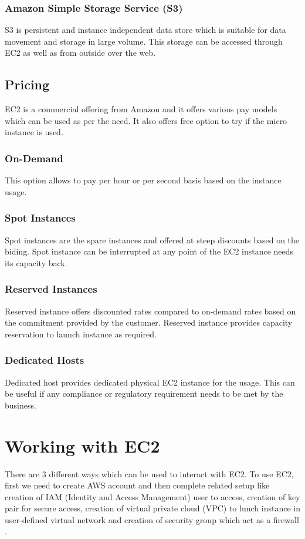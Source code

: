\subsubsection{Amazon Simple Storage Service (S3)} \cite{www-aws-ec2Storage}
S3 is persistent and instance independent data store which is suitable for data movement and storage in large volume. This storage can be accessed through EC2 as well as from outside over the web. 

\subsection{Pricing}
EC2 is a commercial offering from Amazon and it offers various pay models which can be used as per the need. It also offers free option to try if the micro instance is used.
\subsubsection{On-Demand} \cite{www-aws-ec2Pricing}
This option allows to pay per hour or per second basis based on the instance usage.
\subsubsection{Spot Instances} \cite{www-aws-ec2Pricing}
Spot instances are the spare instances and offered at steep discounts based on the biding. Spot instance can be interrupted at any point of the EC2 instance needs its capacity back.
\subsubsection{Reserved Instances} \cite{www-aws-ec2Pricing}
Reserved instance offers discounted rates compared to on-demand rates based on the commitment provided by the customer. Reserved instance provides capacity reservation to launch instance as required.
\subsubsection{Dedicated Hosts} \cite{www-aws-ec2Pricing}
Dedicated host provides dedicated physical EC2 instance for the usage. This can be useful if any compliance or regulatory requirement needs to be met by the business.

\section{Working with EC2}
There are 3 different ways which can be used to interact with EC2. To use EC2, first we need to create AWS account and then complete related setup like creation of IAM (Identity and Access Management) user to access, creation of key pair for secure access, creation of virtual private cloud (VPC) to lunch instance in user-defined virtual network and creation of security group which act as a firewall \cite{www-aws-ec2-setup}.


